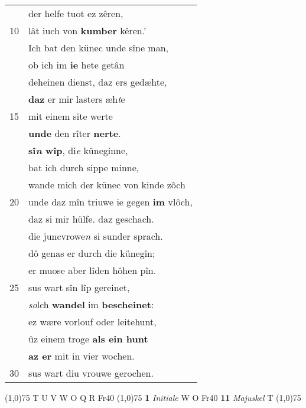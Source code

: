 \documentclass[8pt,a4paper,notitlepage]{article}
\begin{document}
\begin{table}[ht]
\begin{minipage}[t]{0.5\linewidth}
\begin{tabular}{rl}
 & der helfe tuot ez zêren,\\ 
10 & lât iuch von \textbf{kumber} kêren.'\\ 
 & Ich bat den künec unde sîne man,\\ 
 & ob ich im \textbf{ie} hete getân\\ 
 & deheinen dienst, daz ers gedæhte,\\ 
 & \textbf{daz} er mir lasters æh\textit{t}e\\ 
15 & mit einem site werte\\ 
 & \textbf{unde} den rîter \textbf{nerte}.\\ 
 & \textbf{sî\textit{n} wîp}, di\textit{e} küneginne,\\ 
 & bat ich durch sippe minne,\\ 
 & wande mich der künec von kinde zôch\\ 
20 & unde daz mîn triuwe ie gegen \textbf{im} vlôch,\\ 
 & daz si mir hülfe. daz geschach.\\ 
 & die juncvrowe\textit{n} si sunder sprach.\\ 
 & dô genas er durch die künegîn;\\ 
 & er muose aber lîden hôhen pîn.\\ 
25 & sus wart sîn lîp gereinet,\\ 
 & \textit{so}lch \textbf{wandel} im \textbf{bescheinet}:\\ 
 & ez wære vorlouf oder leitehunt,\\ 
 & ûz einem troge \textbf{als ein hunt}\\ 
 & \textbf{az er} mit in vier wochen.\\ 
30 & sus wart diu vrouwe gerochen.\\ 
\end{tabular}
\scriptsize
\line(1,0){75} \newline
T U V W O Q R Fr40 \newline
\line(1,0){75} \newline
\textbf{1} \textit{Initiale} W O Fr40  \textbf{11} \textit{Majuskel} T  \newline
\line(1,0){75} \newline

\end{minipage}
\end{table}
\end{document}
